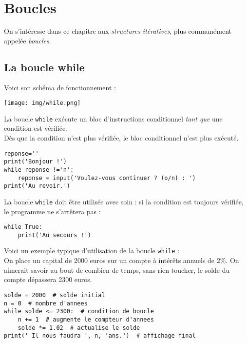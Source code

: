\chapter{Boucles}
On s'intéresse dans ce chapitre aux \textit{structures itératives}, plus communément appelée \textit{boucles}.\\


\section{La boucle while}

Voici son schéma de fonctionnement :
\begin{center}
    \texttt{[image: img/while.png]}
\end{center}

La boucle \texttt{while} exécute un bloc d'instructions conditionnel \textit{tant que} une condition est vérifiée.\\
Dès que la condition n'est plus vérifiée, le bloc conditionnel n'est plus exécuté.

\begin{pys}
\begin{verbatim}
reponse=''
print('Bonjour !')
while reponse !='n':
    reponse = input('Voulez-vous continuer ? (o/n) : ')
print('Au revoir.')
\end{verbatim}
\end{pys}
La boucle \texttt{while} doit être utilisée avec soin : si la condition est toujours vérifiée, le programme ne s'arrêtera pas :

\begin{pyc}
\begin{verbatim}
while True:
    print('Au secours !')
\end{verbatim}
\end{pyc}
Voici un exemple typique d'utilisation de la boucle \texttt{while} : \\

On place un capital de 2000 euros sur un compte à intérêts annuels de 2\%. On aimerait savoir au bout de combien de temps, sans rien toucher, le 
solde du compte dépassera 2300 euros.\\

\begin{pyc}
\begin{verbatim}
solde = 2000  # solde initial
n = 0  # nombre d'annees
while solde <= 2300:  # condition de boucle
    n += 1  # augmente le compteur d'annees
    solde *= 1.02  # actualise le solde
print(' Il nous faudra ', n, 'ans.')  # affichage final   
\end{verbatim}
\end{pyc}


